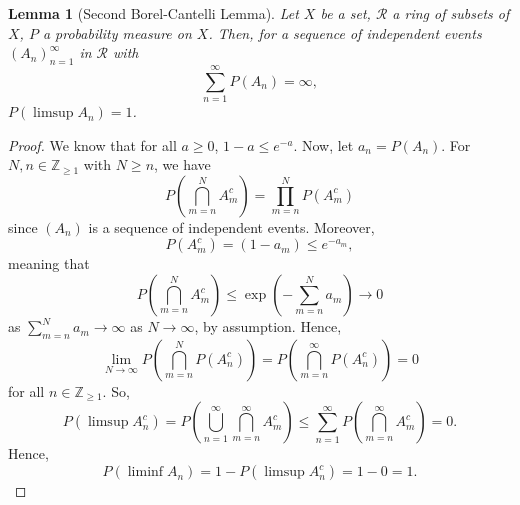 \documentclass[a4paper, openany]{memoir}
\theoremstyle{definition}
\theoremstyle{plain}
\newtheorem{lemma}[definition]{Lemma}
\begin{document}
    \begin{lemma}[Second Borel-Cantelli Lemma]
        Let $X$ be a set, $\mathcal{R}$ a ring of subsets of $X$, $P$ a probability measure on $X$. Then, for a sequence of independent events $(A_n)_{n=1}^\infty$ in $\mathcal{R}$ with
        \[\sum_{n=1}^\infty P(A_n) = \infty,\]
        $P(\limsup A_n) = 1$.
    \end{lemma}
    \begin{proof}
        We know that for all $a \geq 0$, $1 - a \leq e^{-a}$. Now, let $a_n = P(A_n)$. For $N, n \in \mathbb{Z}_{\geq 1}$ with $N \geq n$, we have
        \[P \left(\bigcap_{m=n}^N A_m^c\right) = \prod_{m=n}^N P(A_m^c)\]
        since $(A_n)$ is a sequence of independent events. Moreover,
        \[P(A_m^c) = (1 - a_m) \leq e^{-a_m},\]
        meaning that
        \[P \left(\bigcap_{m=n}^N A_m^c\right) \leq \exp \left(- \sum_{m=n}^N a_m\right) \to 0\]
        as $\sum_{m=n}^N a_m \to \infty$ as $N \to \infty$, by assumption. Hence,
        \[\lim_{N \to \infty} P \left(\bigcap_{m=n}^N P(A_n^c)\right) = P \left(\bigcap_{m=n}^\infty P(A_n^c)\right) = 0\]
        for all $n \in \mathbb{Z}_{\geq 1}$. So,
        \[P(\limsup A_n^c) = P \left(\bigcup_{n=1}^\infty \bigcap_{m=n}^\infty A_m^c\right) \leq \sum_{n=1}^\infty P \left(\bigcap_{m=n}^\infty A_m^c\right) = 0.\]
        Hence,
        \[P(\liminf A_n) = 1 - P(\limsup A_n^c) = 1 - 0 = 1.\]
    \end{proof}
\end{document}
